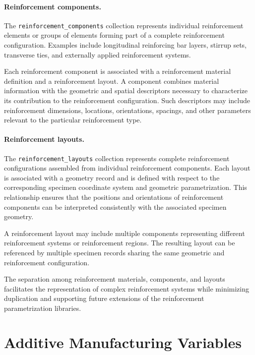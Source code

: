 \paragraph{Reinforcement components.}

The \texttt{reinforcement\_components}
collection represents individual
reinforcement elements or groups of
elements forming part of a complete
reinforcement configuration.
Examples include longitudinal reinforcing
bar layers, stirrup sets, transverse
ties, and externally applied reinforcement
systems.

Each reinforcement component is associated
with a reinforcement material definition
and a reinforcement layout.
A component combines material information
with the geometric and spatial descriptors
necessary to characterize its contribution
to the reinforcement configuration.
Such descriptors may include reinforcement
dimensions, locations, orientations,
spacings, and other parameters relevant
to the particular reinforcement type.

\paragraph{Reinforcement layouts.}

The \texttt{reinforcement\_layouts}
collection represents complete
reinforcement configurations assembled
from individual reinforcement components.
Each layout is associated with a
geometry record and is defined with
respect to the corresponding specimen
coordinate system and geometric
parametrization.
This relationship ensures that the
positions and orientations of
reinforcement components can be
interpreted consistently with
the associated specimen geometry.

A reinforcement layout may include
multiple components representing
different reinforcement systems
or reinforcement regions.
The resulting layout can be referenced
by multiple specimen records sharing
the same geometric and reinforcement
configuration.

The separation among reinforcement
materials, components, and layouts
facilitates the representation of
complex reinforcement systems while
minimizing duplication and supporting
future extensions of the reinforcement
parametrization libraries.


\section{Additive Manufacturing Variables}


